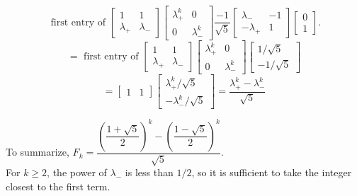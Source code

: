\documentclass[12pt]{amsart}
\begin{document}
\begin{enumerate}
\begin{enumerate}
\[  \text{ first entry of   } \left[ \begin{array}{cc} 1 & 1 \\ \lambda_+ 
& \lambda_- \end{array} \right]
\left[ \begin{array}{cc} \lambda_+^k & 0 \\ 0 & \lambda_-^k \end{array} \right]\frac{-1}{\sqrt{5}}
\left[ \begin{array}{cc} \lambda_- & -1 \\ 
- \lambda_+ & 1  \end{array} \right] \left[ \begin{array}{c} 0 \\ 1 \end{array} \right]. \]
\[ =  \text{ first entry of   }
\left[ \begin{array}{cc} 1 & 1 \\ \lambda_+ 
& \lambda_- \end{array} \right]  \left[ \begin{array}{cc} \lambda_+^k & 0 \\ 0 & \lambda_-^k \end{array} \right] \left[ \begin{array}{c} 1/\sqrt{5} \\ -1 / \sqrt{5} \end{array} \right] \]
\[ =  \left[ \begin{array}{cc} 1 & 1 \end{array} \right] \left[ \begin{array}{c} \lambda_+^k/\sqrt{5} \\ - \lambda_-^k/ \sqrt{5} \end{array} \right] = \dfrac{\lambda_+^k - \lambda_-^k}{\sqrt{5}} \]

To summarize, $F_k = \dfrac{
\left( \dfrac{1 + \sqrt{5}}{2} \right)^k - 
\left( \dfrac{1 - \sqrt{5}}{2} \right)^k}{\sqrt{5}}$.\\
For $k \geq 2$, the power of $\lambda_-$ is less than $1/2$,
so it is sufficient to take the integer closest to the first term.
\end{enumerate}
\end{enumerate}
\end{document}

